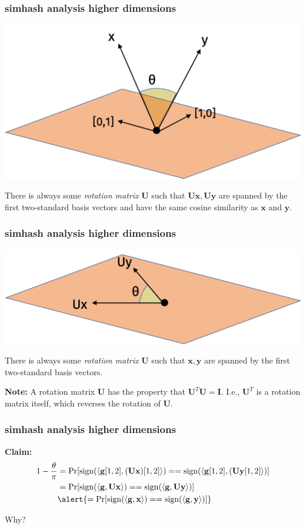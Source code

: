 \documentclass[compress]{beamer}
\newcommand{\bv}[1]{\mathbf{#1}}
\DeclareMathOperator{\sign}{sign}
\begin{document}
\begin{frame}
	\frametitle{simhash analysis higher dimensions}
	\begin{center}
		\includegraphics[width=.7\textwidth]{high_dim1.png}
	\end{center}
There is always some \emph{rotation matrix} $\bv{U}$ such that $\bv{U}\bv{x},\bv{U}\bv{y}$ are spanned by the first two-standard basis vectors and have the same cosine similarity as $\bv{x}$ and $\bv{y}$.
\end{frame}

\begin{frame}
	\frametitle{simhash analysis higher dimensions}
	\begin{center}
		\includegraphics[width=.7\textwidth]{high_dim2.png}
	\end{center}
	There is always some \emph{rotation matrix} $\bv{U}$ such that $\bv{x},\bv{y}$ are spanned by the first two-standard basis vectors. 
	
	
	\textbf{Note:} A rotation matrix $\bv{U}$ has the property that $\bv{U}^T\bv{U} = \bv{I}$. I.e., $\bv{U}^T$ is a rotation matrix itself, which reverses the rotation of $\bv{U}$.
\end{frame}

\begin{frame}[t]
	\frametitle{simhash analysis higher dimensions}
\textbf{Claim:} 
\begin{align*}
1 - \frac{\theta}{\pi} &= \Pr[\sign(\langle \bv{g}[1,2], (\bv{U}\bv{x})[1,2] \rangle) == \sign(\langle \bv{g}[1,2], (\bv{U}\bv{y}[1,2] \rangle)] \\
&= \Pr[\sign(\langle \bv{g}, \bv{U}\bv{x} \rangle) == \sign(\langle \bv{g}, \bv{U}\bv{y} \rangle)] \\
&\alert{= \Pr[\sign(\langle \bv{g}, \bv{x} \rangle) == \sign(\langle \bv{g}, \bv{y} \rangle)]}
\end{align*}

	Why?
\end{frame}
\end{document}

